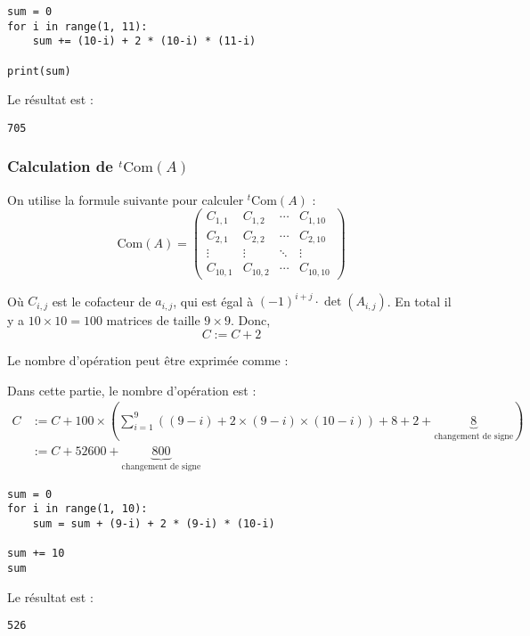 \documentclass{article}
\begin{document}
\begin{lstlisting}
sum = 0
for i in range(1, 11):
    sum += (10-i) + 2 * (10-i) * (11-i)

print(sum)
\end{lstlisting}

Le résultat est :
\begin{lstlisting}
705
\end{lstlisting}


\subsubsection{Calculation de $^t \text{Com}(A)$}

On utilise la formule suivante pour calculer $^t \text{Com}(A)$ :
\[
\text{Com}(A) = \begin{pmatrix}
    C_{1, 1} & C_{1, 2} & \cdots & C_{1, 10} \\
    C_{2, 1} & C_{2, 2} & \cdots & C_{2, 10} \\
    \vdots & \vdots & \ddots & \vdots \\
    C_{10, 1} & C_{10, 2} & \cdots & C_{10, 10}
\end{pmatrix}
\]

Où $C_{i, j}$ est le cofacteur de $a_{i, j}$, qui est égal à $(-1)^{i+j} \cdot \det(A_{i, j})$. En total il y a $10 \times 10 = 100$ matrices de taille $9 \times 9$. Donc, 
\[
C := C + 2
\]

Le nombre d'opération peut être exprimée comme :

\begin{tcolorbox}
    Dans cette partie, le nombre d'opération est :
    \begin{align*}
        C &:= C + 100 \times \left( \sum_{i=1}^{9} ((9-i) + 2 \times  (9 - i) \times  (10 -i))+ 8 + 2+ \underbrace{8}_{\text{changement de signe}}\right)  \\
          &:= C + 52600 + \underbrace{800}_{\text{changement de signe}}
    \end{align*}
\end{tcolorbox}

\begin{lstlisting}
sum = 0
for i in range(1, 10):
    sum = sum + (9-i) + 2 * (9-i) * (10-i)

sum += 10
sum
\end{lstlisting}

Le résultat est :
\begin{lstlisting}
526
\end{lstlisting}
\end{document}
